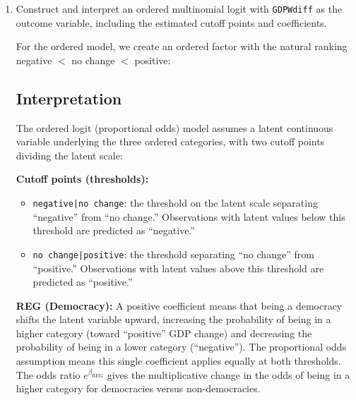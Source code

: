 \documentclass[12pt,letterpaper]{article}
\begin{document}
\begin{enumerate}
\textbf{OIL (Oil Exporter):} The RRR for Oil Exporter is 119.58 in the ``negative'' row and 97.16 in the ``positive'' row. Both are very large, meaning oil exporters are far more likely to experience \textit{either} negative or positive GDP change compared to no change. The ``negative'' RRR being slightly larger suggests oil exporters are marginally more tilted toward negative GDP change relative to positive. However, these very large RRRs reflect the fact that ``no change'' is an extremely rare category in these data (only 16 of 3,721 observations), making the reference group very small and the ratios unstable.

\newpage

	\item Construct and interpret an ordered multinomial logit with \texttt{GDPWdiff} as the outcome variable, including the estimated cutoff points and coefficients.

\vspace{.25cm}

For the ordered model, we create an ordered factor with the natural ranking negative $<$ no change $<$ positive:


\vspace{.5cm}



\subsection*{Interpretation}

The ordered logit (proportional odds) model assumes a latent continuous variable underlying the three ordered categories, with two cutoff points dividing the latent scale:

\textbf{Cutoff points (thresholds):}
\begin{itemize}
	\item \texttt{negative|no change}: the threshold on the latent scale separating ``negative'' from ``no change.'' Observations with latent values below this threshold are predicted as ``negative.''
	\item \texttt{no change|positive}: the threshold separating ``no change'' from ``positive.'' Observations with latent values above this threshold are predicted as ``positive.''
\end{itemize}

\textbf{REG (Democracy):} A positive coefficient means that being a democracy shifts the latent variable upward, increasing the probability of being in a higher category (toward ``positive'' GDP change) and decreasing the probability of being in a lower category (``negative''). The proportional odds assumption means this single coefficient applies equally at both thresholds. The odds ratio $e^{\beta_{\text{REG}}}$ gives the multiplicative change in the odds of being in a higher category for democracies versus non-democracies.


\end{enumerate}
\end{document}
